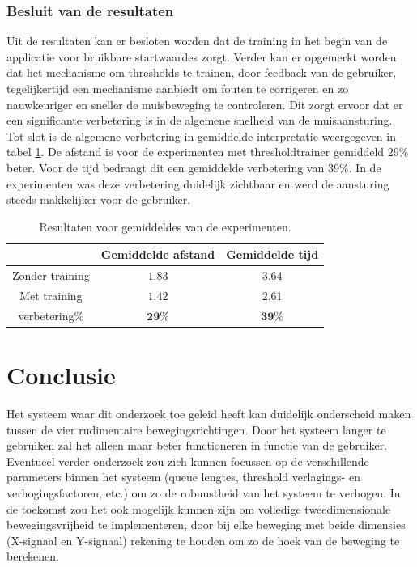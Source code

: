 \documentclass{article}
\begin{document}
\subsubsection*{Besluit van de resultaten}
Uit de resultaten kan er besloten worden dat de training in het begin van de applicatie voor bruikbare startwaardes zorgt. Verder kan er opgemerkt worden dat het mechanisme om thresholds te trainen, door feedback van de gebruiker, tegelijkertijd een mechanisme aanbiedt om fouten te corrigeren en zo nauwkeuriger en sneller de muisbeweging te controleren. Dit zorgt ervoor dat er een significante verbetering is in de algemene snelheid van de muisaansturing.\\
Tot slot is de algemene verbetering in gemiddelde interpretatie weergegeven in tabel \ref{tbl:resgemiddeldes}. De afstand is voor de experimenten met thresholdtrainer gemiddeld $29\%$ beter. Voor de tijd bedraagt dit een gemiddelde verbetering van $39\%$. In de experimenten was deze verbetering duidelijk zichtbaar en werd de aansturing steeds makkelijker voor de gebruiker.
\begin{table}[H]
	\begin{tabular}{|c||c|c|}
		\hline  & \textbf{Gemiddelde afstand} & \textbf{Gemiddelde tijd} \\ 
		\hline Zonder training & $1.83$ &$3.64$\\ 
		\hline Met training  & $1.42$ & $2.61$\\ 
		\hline verbetering\% & $\mathbf{29\%}$  & $\mathbf{39\%}$ \\ 
		\hline 
	\end{tabular} 
	\caption{Resultaten voor gemiddeldes van de experimenten.}
	\label{tbl:resgemiddeldes}
\end{table}
\section{Conclusie}
Het systeem waar dit onderzoek toe geleid heeft kan duidelijk onderscheid maken tussen de vier rudimentaire bewegingsrichtingen. Door het systeem langer te gebruiken zal het alleen maar beter functioneren in functie van de gebruiker. Eventueel verder onderzoek zou zich kunnen focussen op de verschillende parameters binnen het systeem (queue lengtes, threshold verlagings- en verhogingsfactoren,  etc.) om zo de robuustheid van het systeem te verhogen. In de toekomst zou het ook mogelijk kunnen zijn om volledige tweedimensionale bewegingsvrijheid te implementeren, door bij elke beweging met beide dimensies (X-signaal en Y-signaal) rekening te houden om zo de hoek van de beweging te berekenen.

\nocite{Barea:eogmobility}


\end{document}

